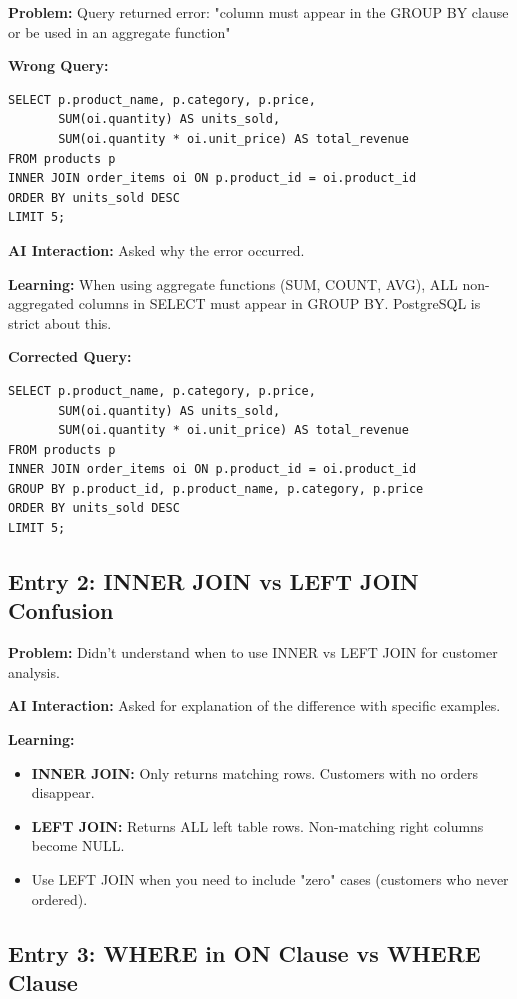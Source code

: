 \documentclass[12pt,a4paper]{article}
\begin{document}
\textbf{Problem:} Query returned error: "column must appear in the GROUP BY clause
or be used in an aggregate function"

\textbf{Wrong Query:}
\begin{lstlisting}
SELECT p.product_name, p.category, p.price,
       SUM(oi.quantity) AS units_sold,
       SUM(oi.quantity * oi.unit_price) AS total_revenue
FROM products p
INNER JOIN order_items oi ON p.product_id = oi.product_id
ORDER BY units_sold DESC
LIMIT 5;
\end{lstlisting}

\textbf{AI Interaction:} Asked why the error occurred.

\textbf{Learning:} When using aggregate functions (SUM, COUNT, AVG), ALL non-aggregated
columns in SELECT must appear in GROUP BY. PostgreSQL is strict about this.

\textbf{Corrected Query:}
\begin{lstlisting}
SELECT p.product_name, p.category, p.price,
       SUM(oi.quantity) AS units_sold,
       SUM(oi.quantity * oi.unit_price) AS total_revenue
FROM products p
INNER JOIN order_items oi ON p.product_id = oi.product_id
GROUP BY p.product_id, p.product_name, p.category, p.price
ORDER BY units_sold DESC
LIMIT 5;
\end{lstlisting}

\subsection*{Entry 2: INNER JOIN vs LEFT JOIN Confusion}

\textbf{Problem:} Didn't understand when to use INNER vs LEFT JOIN for customer analysis.

\textbf{AI Interaction:} Asked for explanation of the difference with specific examples.

\textbf{Learning:}
\begin{itemize}[leftmargin=*,noitemsep]
    \item \textbf{INNER JOIN:} Only returns matching rows. Customers with no orders disappear.
    \item \textbf{LEFT JOIN:} Returns ALL left table rows. Non-matching right columns become NULL.
    \item Use LEFT JOIN when you need to include "zero" cases (customers who never ordered).
\end{itemize}

\subsection*{Entry 3: WHERE in ON Clause vs WHERE Clause}
\end{document}
